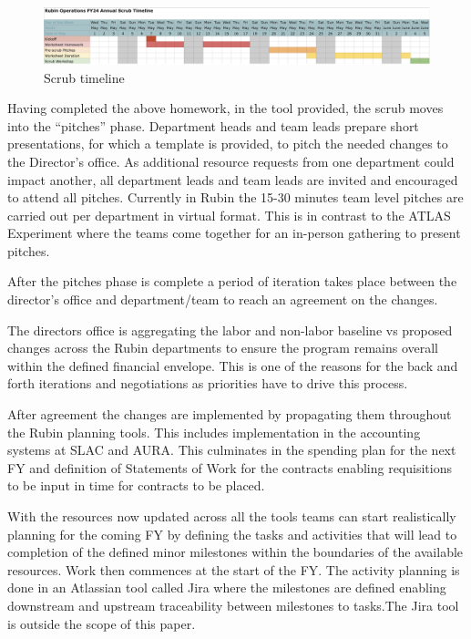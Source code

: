 \begin{figure}[hb!]
\begin{centering}
\includegraphics[width=1.0\textwidth]{Figure1Scrubtimeline}
	\caption{Scrub timeline
\label{fig:timeline}}
\end{centering}
\end{figure}
Having completed the above homework, in the tool provided, the scrub moves into the “pitches” phase. Department heads and team leads prepare short presentations, for which a template is provided, to pitch the needed changes to the Director’s office. As additional resource requests from one department could impact another, all department leads and team leads are invited and encouraged to attend all pitches. Currently in Rubin the 15-30 minutes team level pitches are carried out per department in virtual format. This is in contrast to the ATLAS Experiment where the teams come together for an in-person gathering to present pitches.

After the pitches phase is complete a period of iteration takes place between the director’s office and department/team to reach an agreement on the changes.

The directors office is aggregating the labor and non-labor baseline vs proposed changes across the Rubin departments to ensure the program remains overall within the defined financial envelope. This is one of the reasons for the back and forth iterations and negotiations as priorities have to drive this process.

After agreement the changes are implemented by propagating them throughout the Rubin planning tools. This includes implementation in the accounting systems at SLAC and AURA. This culminates in the spending plan for the next FY and definition of Statements of Work for the contracts enabling requisitions to be input in time for contracts to be placed.

With the resources now updated across all the tools teams can start realistically planning for the coming FY by defining the tasks and activities that will lead to completion of the defined minor milestones within the boundaries of the available resources. Work then commences at the start of the FY. The activity planning is done in an Atlassian tool called Jira where the milestones are defined enabling downstream and upstream traceability between milestones to tasks.The Jira tool is outside the scope of this paper.

